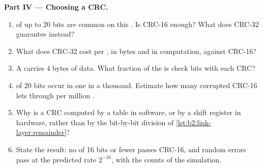 \begin{problem}
\medskip\noindent\textbf{Part IV --- Choosing a CRC.}\par\nopagebreak
\begin{enumerate}[resume, beginpenalty=10000]
\item {} of up to 20 bits are common on this . Is CRC-16 enough? What does CRC-32 guarantee instead?
\item What does CRC-32 cost per , in bytes and in computation, against CRC-16?
\item A  carries 4 bytes of data. What fraction of the  is check bits with each CRC?
\item {} of 20 bits occur in one  in a thousand. Estimate how many corrupted  CRC-16 lets through per
million .
\item Why is a CRC computed by a table in software, or by a shift register in hardware, rather than by the
bit-by-bit division of \cref{lst:b2:link-layer:remainder}?
\item State the result: no  of 16 bits or fewer passes CRC-16, and random errors pass at the predicted rate
$2^{-16}$, with the counts of the simulation.
\end{enumerate}
\end{problem}
